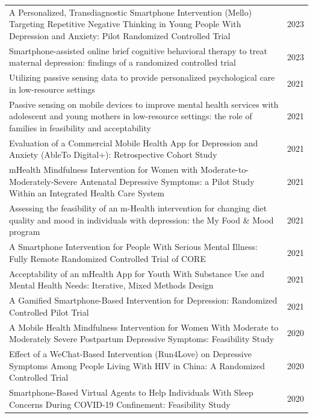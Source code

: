 \begin{longtable}{@{}p{} r@{}}
A Personalized, Transdiagnostic Smartphone Intervention (Mello) Targeting Repetitive Negative Thinking in Young People With Depression and Anxiety: Pilot Randomized Controlled Trial~\cite{bell2023mello} & 2023 \\
Smartphone-assisted online brief cognitive behavioral therapy to treat maternal depression: findings of a randomized controlled trial~\cite{fatori2023maternaldepression} & 2023 \\
Utilizing passive sensing data to provide personalized psychological care in low-resource settings~\cite{byanjankar2021passivesensing} & 2021 \\
Passive sensing on mobile devices to improve mental health services with adolescent and young mothers in low-resource settings: the role of families in feasibility and acceptability~\cite{maharjan2021passivesensing} & 2021 \\
Evaluation of a Commercial Mobile Health App for Depression and Anxiety (AbleTo Digital+): Retrospective Cohort Study~\cite{anton2021ableto} & 2021 \\
mHealth Mindfulness Intervention for Women with Moderate-to-Moderately-Severe Antenatal Depressive Symptoms: a Pilot Study Within an Integrated Health Care System~\cite{kubo2021mhealthmindfulness} & 2021 \\
Assessing the feasibility of an m-Health intervention for changing diet quality and mood in individuals with depression: the My Food \& Mood program~\cite{young2021myfoodmood} & 2021 \\
A Smartphone Intervention for People With Serious Mental Illness: Fully Remote Randomized Controlled Trial of CORE~\cite{ben-zeev2021core} & 2021 \\
Acceptability of an mHealth App for Youth With Substance Use and Mental Health Needs: Iterative, Mixed Methods Design~\cite{adams2021mhealthapp} & 2021 \\
A Gamified Smartphone-Based Intervention for Depression: Randomized Controlled Pilot Trial~\cite{lukas2021mentalis} & 2021 \\
A Mobile Health Mindfulness Intervention for Women With Moderate to Moderately Severe Postpartum Depressive Symptoms: Feasibility Study~\cite{avalos2020mhealthmindfulness} & 2020 \\
Effect of a WeChat-Based Intervention (Run4Love) on Depressive Symptoms Among People Living With HIV in China: A Randomized Controlled Trial~\cite{guo2020run4love} & 2020 \\
Smartphone-Based Virtual Agents to Help Individuals With Sleep Concerns During COVID-19 Confinement: Feasibility Study~\cite{philip2020kanopee} & 2020 \\

\end{longtable}
